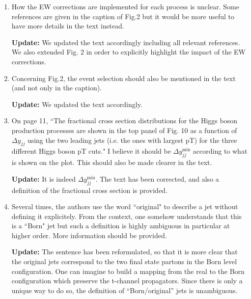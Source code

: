 \documentclass[12pt]{article}
\begin{document}
\begin{enumerate}
{\bf Update:} The ttH process has been included in Fig. 2 for illustration of its impact. However, it is not considered in the rest of the paper. We updated footnote 2 and clarified this. Regarding the implementation of ttH for Fig. 2 we incorporated this information in the main text: for the fiducial selection shown in Fig. 2 (right) indeed the 4j+2j\_b final state has been considered treating bottom jets as jets. References were added for the ATLAS and CMS discovery papers for ttH.

\item How the EW corrections are implemented for each process is unclear. Some references are given in the caption of Fig.2 but it would be more useful to have more details in the text instead.

{\bf Update:} We updated the text accordingly including all relevant references. We also extended Fig. 2 in order to explicitly highlight the impact of the EW corrections.

\item Concerning Fig.2, the event selection should also be mentioned in the text (and not only in the caption).

{\bf Update:} We updated the text accordingly.

\item On page 11, ``The fractional cross section distributions for the Higgs boson production processes are shown in the top panel of Fig. 10 as a function of $\Delta y_{jj}$ using the two leading jets (i.e. the ones with largest pT) for the three different Higgs boson pT cuts." I believe it should be $\Delta y_{jj}^{\text{min}}$ according to what is shown on the plot. This should also be made clearer in the text.

{\bf Update:} It is indeed $\Delta y_{jj}^{\text{min}}$. The text has been corrected, and also a definition of the fractional cross section is provided.

\item Several times, the authors use the word ``original" to describe a jet without defining it explicitely. From the context, one somehow understands that this is a ``Born" jet but such a definition is highly ambiguous in particular at higher order. More information should be provided.

{\bf Update:} The sentence has been reformulated, so that it is more clear that  the original jets correspond to the two final state partons in the Born level configuration. One can imagine to build a mapping from the real to the Born configuration which preserve the t-channel propagators. Since there is only a unique way to do so, the definition of ``Born/original'' jets is unambiguous.

\end{enumerate}
\end{document}
